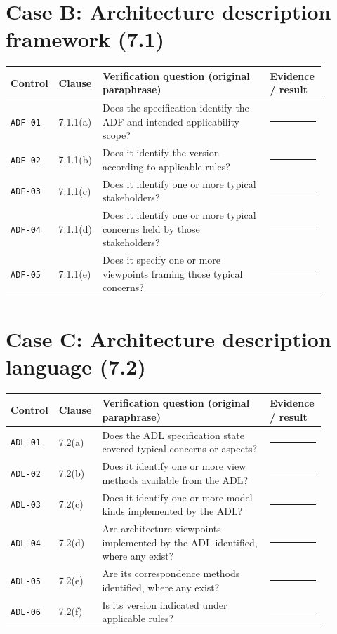 \documentclass[11pt,letterpaper]{article}
\newcommand{\AuditingHead}{\begin{longtable}{p{0.10\linewidth}p{0.10\linewidth}p{0.52\linewidth}p{0.17\linewidth}}\toprule\textbf{Control}&\textbf{Clause}&\textbf{Verification question (original paraphrase)}&\textbf{Evidence / result}\\\midrule\endhead}
\newcommand{\AuditingEnd}{\bottomrule\end{longtable}}
\newcommand{\AuditRow}[4]{\texttt{#1} & #2 & #3 & #4\\}
\begin{document}
\section{Case B: Architecture description framework (7.1)}
\AuditingHead
\AuditRow{ADF-01}{7.1.1(a)}{Does the specification identify the ADF and intended applicability scope?}{\rule[-0.4em]{0pt}{2em}\rule{0.60\linewidth}{0.4pt}}
\AuditRow{ADF-02}{7.1.1(b)}{Does it identify the version according to applicable rules?}{\rule[-0.4em]{0pt}{2em}\rule{0.60\linewidth}{0.4pt}}
\AuditRow{ADF-03}{7.1.1(c)}{Does it identify one or more typical stakeholders?}{\rule[-0.4em]{0pt}{2em}\rule{0.60\linewidth}{0.4pt}}
\AuditRow{ADF-04}{7.1.1(d)}{Does it identify one or more typical concerns held by those stakeholders?}{\rule[-0.4em]{0pt}{2em}\rule{0.60\linewidth}{0.4pt}}
\AuditRow{ADF-05}{7.1.1(e)}{Does it specify one or more viewpoints framing those typical concerns?}{\rule[-0.4em]{0pt}{2em}\rule{0.60\linewidth}{0.4pt}}
\AuditingEnd

\section{Case C: Architecture description language (7.2)}
\AuditingHead
\AuditRow{ADL-01}{7.2(a)}{Does the ADL specification state covered typical concerns or aspects?}{\rule[-0.4em]{0pt}{2em}\rule{0.60\linewidth}{0.4pt}}
\AuditRow{ADL-02}{7.2(b)}{Does it identify one or more view methods available from the ADL?}{\rule[-0.4em]{0pt}{2em}\rule{0.60\linewidth}{0.4pt}}
\AuditRow{ADL-03}{7.2(c)}{Does it identify one or more model kinds implemented by the ADL?}{\rule[-0.4em]{0pt}{2em}\rule{0.60\linewidth}{0.4pt}}
\AuditRow{ADL-04}{7.2(d)}{Are architecture viewpoints implemented by the ADL identified, where any exist?}{\rule[-0.4em]{0pt}{2em}\rule{0.60\linewidth}{0.4pt}}
\AuditRow{ADL-05}{7.2(e)}{Are its correspondence methods identified, where any exist?}{\rule[-0.4em]{0pt}{2em}\rule{0.60\linewidth}{0.4pt}}
\AuditRow{ADL-06}{7.2(f)}{Is its version indicated under applicable rules?}{\rule[-0.4em]{0pt}{2em}\rule{0.60\linewidth}{0.4pt}}
\AuditingEnd
\end{document}
